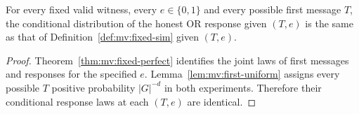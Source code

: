 \begin{corollary}\label{cor:mv:conditional-response}
For every fixed valid witness, every
$e\in\{0,1\}$ and every possible first message $T$,
the conditional distribution of the honest
OR response given $(T,e)$ is the same as that
of Definition~\ref{def:mv:fixed-sim} given $(T,e)$.
\end{corollary}
\begin{proof}
Theorem~\ref{thm:mv:fixed-perfect}
identifies the joint laws of first messages
and responses for the specified $e$.
Lemma~\ref{lem:mv:first-uniform} assigns
every possible $T$ positive probability
$|G|^{-d}$ in both experiments.
Therefore their conditional response
laws at each $(T,e)$ are identical.
\end{proof}
